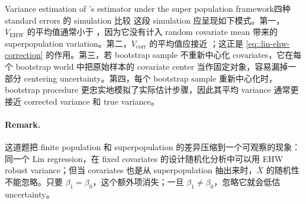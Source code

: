 \begin{exercisesolution}{Variance estimation of \citet{lin2013}'s estimator under the super population framework}{四种 standard errors 的 simulation 比较}
这段 simulation 应呈现如下模式。第一，$V_{\mathrm{EHW}}$ 的平均值通常小于 ，因为它没有计入 random covariate mean 带来的 superpopulation variation。第二，$V_{\mathrm{corr}}$ 的平均值应接近 ；这正是 \cref{eq::lin-ehw-correction} 的作用。第三，若 bootstrap sample 不重新中心化 covariates，它在每个 bootstrap world 中把原始样本的 covariate center 当作固定对象，容易漏掉一部分 centering uncertainty。第四，每个 bootstrap sample 重新中心化时，bootstrap procedure 更忠实地模拟了实际估计步骤，因此其平均 variance 通常更接近 corrected variance 和 true variance。

\paragraph{Remark.}
这道题把 finite population 和 superpopulation 的差异压缩到一个可观察的现象：同一个 Lin regression，在 fixed covariates 的设计随机化分析中可以用 EHW robust variance；但当 covariates 也是从 superpopulation 抽出来时，$\bar X$ 的随机性不能忽略。只要 $\beta_1=\beta_0$，这个额外项消失；一旦 $\beta_1\neq\beta_0$，忽略它就会低估 uncertainty。
\end{exercisesolution}
